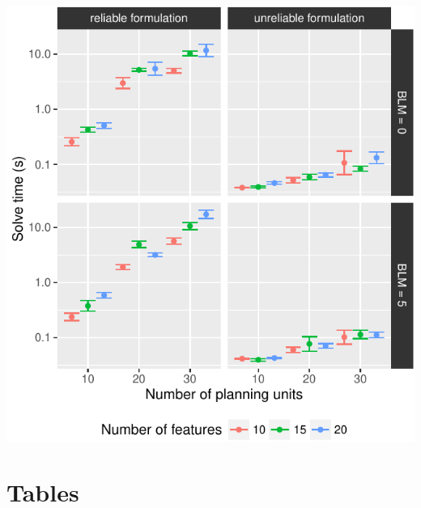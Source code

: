 \documentclass[11pt,]{article}
\let\origfigure\figure
\let\endorigfigure\endfigure
\renewenvironment{figure}[1][2] {
	\expandafter\origfigure\expandafter[H]
} {
	\endorigfigure
}
\begin{document}
\begin{figure}
\centering
\includegraphics{supporting-information_files/figure-latex/unnamed-chunk-4-1.pdf}
\caption{Time required to solve different sized problems using different
parameters and formulations. Points represent average times and bars
show standard errors. Time is shown on a log\(_{10}\) scale.}
\end{figure}

\clearpage

\section{Tables}\label{tables}
\end{document}

